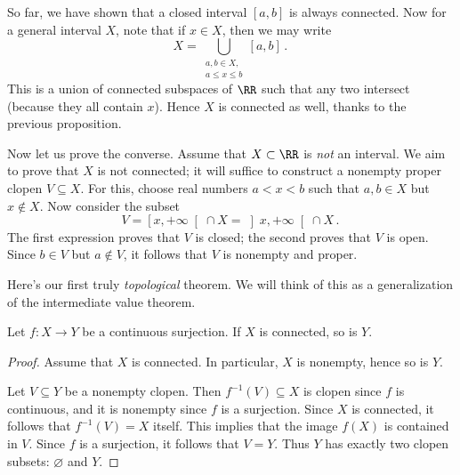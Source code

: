\begin{exm}
	So far, we have shown that a closed interval $[a,b]$ is always connected.
	Now for a general interval $X$, note that if $x\in X$, then we may write
	\[
		X = \bigcup_{\substack{a,b\in X, \\ a\leq x\leq b}} [a,b] \period
	\]
	This is a union of connected subspaces of $\RR$ such that any two intersect (because they all contain $x$).
	Hence $X$ is connected as well, thanks to the previous proposition.

	Now let us prove the converse.
	Assume that $X \subset \RR$ is \emph{not} an interval.
	We aim to prove that $X$ is not connected;
	it will suffice to construct a nonempty proper clopen $ V \subseteq X$.
	For this, choose real numbers $a<x<b$ such that $a,b \in X$ but $x \notin X$.
	Now consider the subset
	\[
		V = \left[x,+\infty\right[ \cap X = \left]x,+\infty\right[ \cap X \period
	\]
	The first expression proves that $V$ is closed; the second proves that $V$ is open.
	Since $b \in V$ but $a\notin V$, it follows that $V$ is nonempty and proper.
\end{exm}

Here's our first truly \emph{topological} theorem.
We will think of this as a generalization of the intermediate value theorem.
\begin{thm}%
\label{thm:IVT}
	Let $ f \colon X \to Y $ be a continuous surjection.
	If $X$ is connected, so is $Y$.
\end{thm}

\begin{proof}
	Assume that $X$ is connected.
	In particular, $X$ is nonempty, hence so is $Y$.
	
	Let $ V \subseteq Y $ be a nonempty clopen.
	Then $f^{-1}(V) \subseteq X$ is clopen since $f $ is continuous, and it is nonempty since $f$ is a surjection.
	Since $X$ is connected, it follows that $f^{-1}(V) = X$ itself.
	This implies that the image $f(X)$ is contained in $V$.
	Since $f$ is a surjection, it follows that $V=Y$.
	Thus $Y$ has exactly two clopen subsets: $\varnothing$ and $Y$.
\end{proof}

